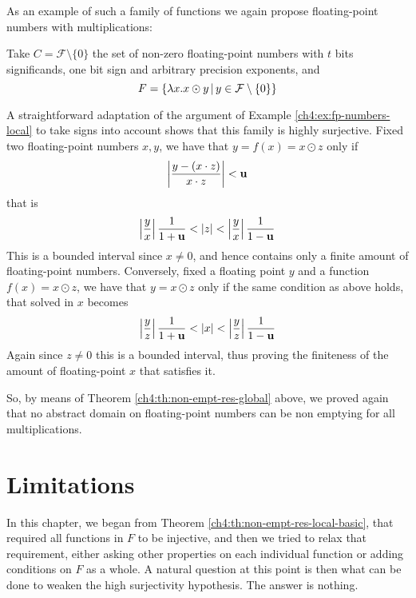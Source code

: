 As an example of such a family of functions we again propose floating-point numbers with multiplications:
\begin{example}\label{ch4:ex:fp-numbers-global}
	Take $C = \mathcal{F} \setminus \{ 0 \}$ the set of non-zero floating-point numbers with $t$ bits significands, one bit sign and arbitrary precision exponents, and
	\[
	F = \{ \lambda x . x \odot y \,\vert\, y \in \mathcal{F} \setminus \{ 0 \} \}
	\]

	A straightforward adaptation of the argument of Example \ref{ch4:ex:fp-numbers-local} to take signs into account shows that this family is highly surjective.
	Fixed two floating-point numbers $x, y$, we have that $y = f(x) = x \odot z$ only if
	\[
	\left\lvert \frac{y - (x \cdot z)}{x \cdot z} \right\rvert < \textbf{u}
	\]
	that is
	\[
	\left\lvert\frac{y}{x}\right\rvert \frac{1}{1+\textbf{u}} < \lvert z\rvert < \left\lvert\frac{y}{x}\right\rvert \frac{1}{1-\textbf{u}}
	\]
	This is a bounded interval since $x \neq 0$, and hence contains only a finite amount of floating-point numbers.
	Conversely, fixed a floating point $y$ and a function $f(x) = x \odot z$, we have that $y = x \odot z$ only if the same condition as above holds, that solved in $x$ becomes
	\[
	\left\lvert\frac{y}{z}\right\rvert \frac{1}{1+\textbf{u}} < \lvert x\rvert < \left\lvert\frac{y}{z}\right\rvert \frac{1}{1-\textbf{u}}
	\]
	Again since $z \neq 0$ this is a bounded interval, thus proving the finiteness of the amount of floating-point $x$ that satisfies it.

	So, by means of Theorem \ref{ch4:th:non-empt-res-global} above, we proved again that no abstract domain on floating-point numbers can be non emptying for all multiplications.
\end{example}

\section{Limitations}
In this chapter, we began from Theorem \ref{ch4:th:non-empt-res-local-basic}, that required all functions in $F$ to be injective, and then we tried to relax that requirement, either asking other properties on each individual function or adding conditions on $F$ as a whole.
A natural question at this point is then what can be done to weaken the high surjectivity hypothesis. The answer is nothing.

